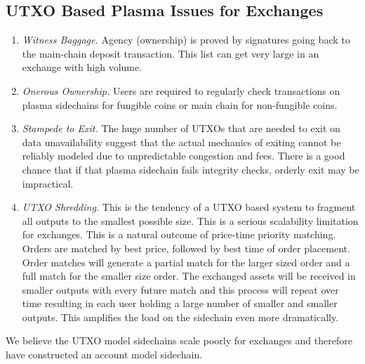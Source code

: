 \documentclass[12pt,a4paper]{article}
\begin{document}
\subsection{UTXO Based Plasma Issues for Exchanges}
\begin{enumerate}
    \item \emph{Witness Baggage.} Agency (ownership) is proved by signatures going back to the main-chain deposit transaction. This list can get very large in an exchange with high volume.
    \item \emph{Onerous Ownership.} Users are required to regularly check transactions on plasma sidechains for fungible coins or main chain for non-fungible coins.
    \item \emph{Stampede to Exit.} The huge number of UTXOs that are needed to exit on data unavailability suggest that the actual mechanics of exiting cannot be reliably modeled due to unpredictable congestion and fees. There is a good chance that if that plasma sidechain fails integrity checks, orderly exit may be impractical.
    \item \emph{UTXO Shredding.} This is the tendency of a UTXO based system to fragment all outputs to the smallest possible size. This is a serious scalability limitation for exchanges. This is a natural outcome of price-time priority matching. Orders are matched by best price, followed by best time of order placement. Order matches will generate a partial match for the larger sized order and a full match for the smaller size order. The exchanged assets will be received in smaller outputs with every future match and this process will repeat over time resulting in each user holding a large number of smaller and smaller outputs. This amplifies the load on the sidechain even more dramatically.

\end{enumerate}

We believe the UTXO model sidechains scale poorly for exchanges and therefore have constructed an account model sidechain.
\end{document}

